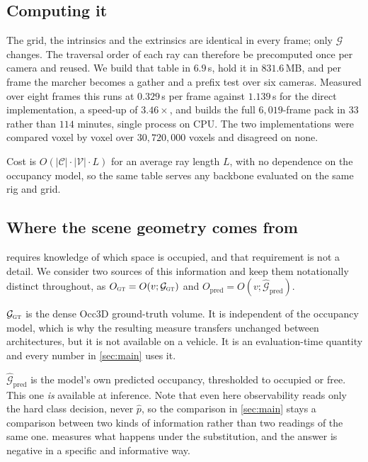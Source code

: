 \documentclass[10pt,twocolumn,letterpaper]{article}
\begin{document}
\subsection{Computing it}
\label{sec:compute}
The grid, the intrinsics and the extrinsics are identical in every frame;
only $\mathcal{G}$ changes. The traversal order of each ray can therefore
be precomputed once per camera and reused. We build that table in
$6.9$\,s, hold it in $831.6$\,MB, and per frame the marcher becomes a
gather and a prefix test over six cameras. Measured over eight frames this
runs at $0.329$\,s per frame against $1.139$\,s for the direct
implementation, a speed-up of $3.46\times$, and builds the full
$6{,}019$-frame pack in $33$ rather than $114$ minutes, single process on
CPU. The two implementations were compared voxel by voxel over
$30{,}720{,}000$ voxels and disagreed on none.

Cost is $O(|\mathcal{C}|\cdot|\mathcal{V}|\cdot L)$ for an average ray
length $L$, with no dependence on the occupancy model, so the same table
serves any backbone evaluated on the same rig and grid.

\subsection{Where the scene geometry comes from}
\label{sec:source}
 requires knowledge of which space is occupied, and that
requirement is not a detail. We consider two sources of this information
and keep them notationally distinct throughout, as
$O_{\textsc{gt}} = O(v;\mathcal{G}_{\textsc{gt}})$
and $O_{\text{pred}} = O(v;\hat{\mathcal{G}}_{\text{pred}})$.

$\mathcal{G}_{\textsc{gt}}$ is the dense Occ3D ground-truth volume. It is
independent of the occupancy model, which is why the resulting measure
transfers unchanged between architectures, but it is not available on a
vehicle. It is an evaluation-time quantity and every number in
\cref{sec:main} uses it.

$\hat{\mathcal{G}}_{\text{pred}}$ is the model's own predicted occupancy,
thresholded to occupied or free. This one \emph{is} available at inference.
Note that even here observability reads only the hard class decision, never
$\hat{p}$, so the comparison in \cref{sec:main} stays a comparison between
two kinds of information rather than two readings of the same one.
 measures what happens under the substitution, and
the answer is negative in a specific and informative way.
\end{document}
